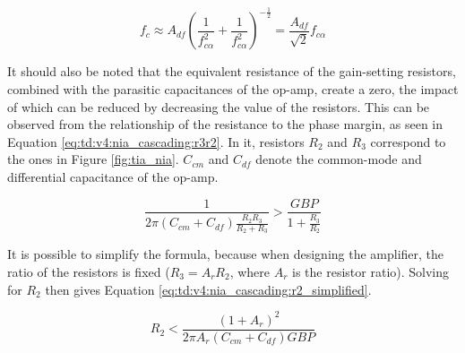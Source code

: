 \begin{equation}\label{eq:td:v4:nia_cascading}
	f_c \approx A_{df}\left(\frac{1}{f_{c\alpha}^2} + \frac{1}{f_{c\alpha}^2}\right)^{-\frac{1}{2}} = \frac{A_{df}}{\sqrt{2}}f_{c\alpha}
\end{equation}

It should also be noted that the equivalent resistance of the gain-setting resistors, combined with the parasitic capacitances of the op-amp, create a zero, the impact of which can be reduced by decreasing the value of the resistors. This can be observed from the relationship of the resistance to the phase margin, as seen in Equation \eqref{eq:td:v4:nia_cascading:r3r2}. In it, resistors $R_2$ and $R_3$ correspond to the ones in Figure \ref{fig:tia_nia}. $C_{cm}$ and $C_{df}$ denote the common-mode and differential capacitance of the op-amp.

\begin{equation}\label{eq:td:v4:nia_cascading:r3r2}
	\frac{1}{2\pi\left(C_{cm} + C_{df}\right)\frac{R_2R_3}{R_2 + R_3}} > \frac{GBP}{1 + \frac{R_3}{R_2}}
\end{equation}

It is possible to simplify the formula, because when designing the amplifier, the ratio of the resistors is fixed ($R_3 = A_rR_2$, where $A_r$ is the resistor ratio). Solving for $R_2$ then gives Equation \eqref{eq:td:v4:nia_cascading:r2_simplified}.

\begin{equation}\label{eq:td:v4:nia_cascading:r2_simplified}
	R_2 < \frac{(1 + A_r)^2}{2\pi A_r\left(C_{cm} + C_{df}\right)GBP} 
\end{equation}




